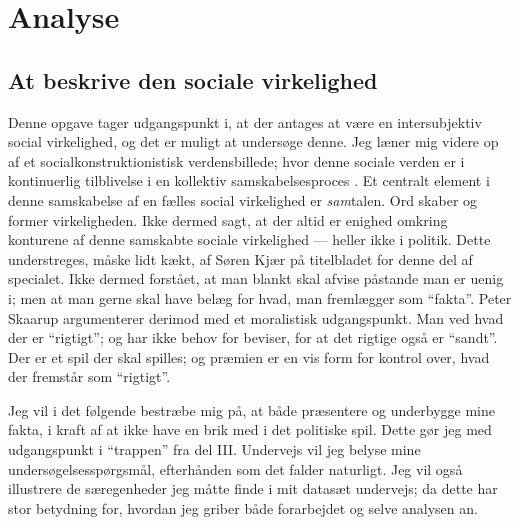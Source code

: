 \renewcommand*{\afterpartskip}{
\vfil
\begin{epigraphs}
\qitem{\itshape
“Jo, hvis dét skal kaldes Fakta, saa benægter a Fakta!”
}{folketingsmedlem Søren Kjær, i debat med Carl Steen Andersen Bille}
\qitem{\itshape
  Politik skal ikke videnskabeliggøres. Der findes ikke noget facit i politik – kun følelser og holdninger. Begreber som sandt og falsk eller godt og ondt har ganske enkelt ikke hjemme i det politiske rum. 
}{Peter Skaarup, i et ugebrev for Dansk Folkeparti, \citeyear{skaarupPolitikErForst2017}}
\end{epigraphs}}

\part{Analyse}\label{part:analysis}

\chapter{At beskrive den sociale virkelighed}

Denne opgave tager udgangspunkt i, at der antages at være en intersubjektiv social virkelighed, og det er muligt at undersøge denne.
Jeg læner mig videre op af et socialkonstruktionistisk verdensbillede; hvor denne sociale verden er i kontinuerlig tilblivelse i en kollektiv samskabelsesproces \autocite{}.
Et centralt element i denne samskabelse af en fælles social virkelighed er \textit{sam}talen.
Ord skaber og former virkeligheden.
Ikke dermed sagt, at der altid er enighed omkring konturene af denne samskabte sociale virkelighed — heller ikke i politik.
Dette understreges, måske lidt kækt, af Søren Kjær på titelbladet for denne del af specialet.
Ikke dermed forstået, at man blankt skal afvise påstande man er uenig i; men at man gerne skal have belæg for hvad, man fremlægger som “fakta”.
Peter Skaarup argumenterer derimod med et moralistisk udgangspunkt.
Man ved hvad der er “rigtigt”; og har ikke behov for beviser, for at det rigtige også er “sandt”.
Der er et spil der skal spilles; og præmien er en vis form for kontrol over, hvad der fremstår som “rigtigt”.

Jeg vil i det følgende bestræbe mig på, at både præsentere og underbygge mine fakta, i kraft af at ikke have en brik med i det politiske spil.
Dette gør jeg med udgangspunkt i “trappen” fra del III.
Undervejs vil jeg belyse mine undersøgelsesspørgsmål, efterhånden som det falder naturligt.
Jeg vil også illustrere de særegenheder jeg måtte finde i mit datasæt undervejs; da dette har stor betydning for, hvordan jeg griber både forarbejdet og selve analysen an.

